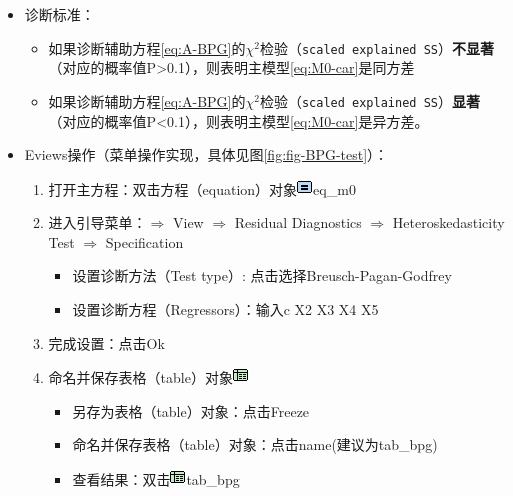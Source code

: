 \documentclass[12pt,(landscape,a4paper),(portrait,a4paper)]{article}
\providecommand{\tightlist}{%
  \setlength{\itemsep}{0pt}\setlength{\parskip}{0pt}}
\begin{document}
\begin{itemize}
\tightlist
\item
  诊断标准：

  \begin{itemize}
  \tightlist
  \item
    如果诊断辅助方程\eqref{eq:A-BPG}的\(\chi^2\)检验（\texttt{scaled\ explained\ SS}）\textbf{不显著}（对应的概率值P\textgreater{}0.1），则表明主模型\eqref{eq:M0-car}是同方差
  \item
    如果诊断辅助方程\eqref{eq:A-BPG}的\(\chi^2\)检验（\texttt{scaled\ explained\ SS}）\textbf{显著}（对应的概率值P\textless{}0.1），则表明主模型\eqref{eq:M0-car}是异方差。
  \end{itemize}
\item
  Eviews操作（菜单操作实现，具体见图\ref{fig:fig-BPG-test}）：

  \begin{enumerate}
  \def\labelenumi{\arabic{enumi})}
  \tightlist
  \item
    打开主方程：双击方程（equation）对象\includegraphics{picture/object/Equation.png}eq\_m0\\
  \item
    进入引导菜单：\(\Rightarrow\) View \(\Rightarrow\) Residual
    Diagnostics \(\Rightarrow\) Heteroskedasticity Test \(\Rightarrow\)
    Specification

    \begin{itemize}
    \tightlist
    \item
      设置诊断方法（Test type）: 点击选择Breusch-Pagan-Godfrey
    \item
      设置诊断方程（Regressors）：输入c X2 X3 X4 X5\\
    \end{itemize}
  \item
    完成设置：点击Ok\\
  \item
    命名并保存表格（table）对象\includegraphics{picture/object/Table.png}

    \begin{itemize}
    \tightlist
    \item
      另存为表格（table）对象：点击Freeze
    \item
      命名并保存表格（table）对象：点击name(建议为tab\_bpg)
    \item
      查看结果：双击\includegraphics{picture/object/Table.png}tab\_bpg
    \end{itemize}
  \end{enumerate}
\end{itemize}
\end{document}
